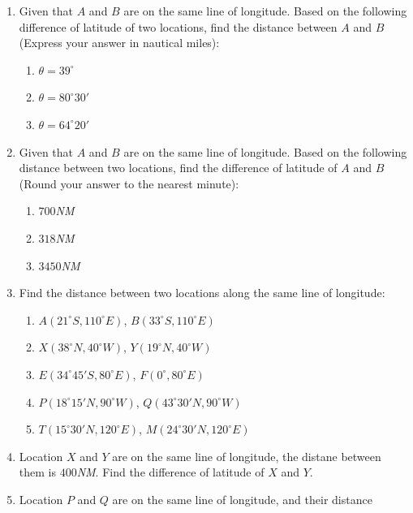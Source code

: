 \documentclass{report}
\begin{document}
\begin{multicols}{2}
    \begin{enumerate}
        \item Given that $A$ and $B$ are on the same line of longitude. Based on the
              following difference of latitude of two locations, find the distance between
              $A$ and $B$ (Express your answer in nautical miles):
              \begin{enumerate}
                  \item $\theta = 39^\circ$
                  \item $\theta = 80^\circ 30'$
                  \item $\theta = 64^\circ 20'$
              \end{enumerate}
        \item Given that $A$ and $B$ are on the same line of longitude. Based on the
              following distance between two locations, find the difference of latitude of
              $A$ and $B$ (Round your answer to the nearest minute):
              \begin{enumerate}
                  \item $700$\emph{NM}
                  \item $318$\emph{NM}
                  \item $3450$\emph{NM}
              \end{enumerate}
        \item Find the distance between two locations along the same line of longitude:
              \begin{enumerate}
                  \item $A(21^\circ S, 110^\circ E)$, $B(33^\circ S, 110^\circ E)$
                  \item $X(38^\circ N, 40^\circ W)$, $Y(19^\circ N, 40^\circ W)$
                  \item $E(34^\circ 45' S, 80^\circ E)$, $F(0^\circ, 80^\circ E)$
                  \item $P(18^\circ 15' N, 90^\circ W)$, $Q(43^\circ 30' N, 90^\circ W)$
                  \item $T(15^\circ 30' N, 120^\circ E)$, $M(24^\circ 30' N, 120^\circ E)$
              \end{enumerate}
        \item Location $X$ and $Y$ are on the same line of longitude, the distane between
              them is $400$\emph{NM}. Find the difference of latitude of $X$ and $Y$.
        \item Location $P$ and $Q$ are on the same line of longitude, and their distance

\end{enumerate}
\end{multicols}
\end{document}
